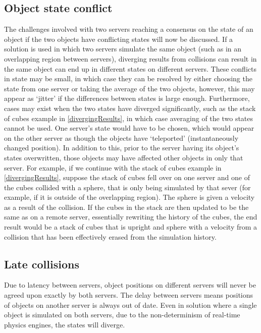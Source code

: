 \subsection{Object state conflict}
The challenges involved with two servers reaching a consensus on the state of an object if the two objects have conflicting states will now be discussed. If a solution is used in which two servers simulate the same object (such as in an overlapping region between servers), diverging results from collisions can result in the same object can end up in different states on different servers. These conflicts in state may be small, in which case they can be resolved by either choosing the state from one server or taking the average of the two objects, however, this may appear as `jitter' if the differences between states is large enough. Furthermore, cases may exist when the two states have diverged significantly, such as the stack of cubes example in \ref{divergingResults}, in which case averaging of the two states cannot be used. One server's state would have to be chosen, which would appear on the other server as though the objects have `teleported' (instantaneously changed position). In addition to this, prior to the server having its object's states overwritten, those objects may have affected other objects in only that server. For example, if we continue with the stack of cubes example in \ref{divergingResults}, suppose the stack of cubes fell over on one server and one of the cubes collided with a sphere, that is only being simulated by that sever (for example, if it is outside of the overlapping region). The sphere is given a velocity as a result of the collision. If the cubes in the stack are then updated to be the same as on a remote server, essentially rewriting the history of the cubes, the end result would be a stack of cubes that is upright and sphere with a velocity from a collision that has been effectively erased from the simulation history.

\subsection{Late collisions}\label{lateCollisions}
Due to latency between servers, object positions on different servers will never be agreed upon exactly by both servers. The delay between servers means positions of objects on another server is always out of date. Even in solution where a single object is simulated on both servers, due to the non-determinism of real-time physics engines, the states will diverge. 

